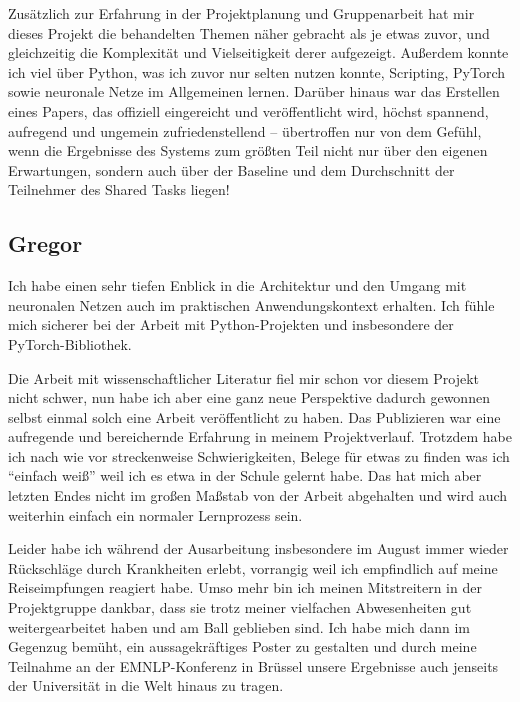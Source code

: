 \documentclass[11pt,a4paper]{article}
\begin{document}
Zusätzlich zur Erfahrung in der Projektplanung und Gruppenarbeit hat mir dieses Projekt die behandelten Themen näher gebracht als je etwas zuvor, und gleichzeitig die Komplexität und Vielseitigkeit derer aufgezeigt. Außerdem konnte ich viel über Python, was ich zuvor nur selten nutzen konnte, Scripting, PyTorch sowie neuronale Netze im Allgemeinen lernen. Darüber hinaus war das Erstellen eines Papers, das offiziell eingereicht und veröffentlicht wird, höchst spannend, aufregend und ungemein zufriedenstellend -- übertroffen nur von dem Gefühl, wenn die Ergebnisse des Systems zum größten Teil nicht nur über den eigenen Erwartungen, sondern auch über der Baseline und dem Durchschnitt der Teilnehmer des Shared Tasks liegen!

\subsection{Gregor}
Ich habe einen sehr tiefen Enblick in die Architektur und den Umgang mit neuronalen Netzen auch im praktischen Anwendungskontext erhalten. Ich fühle mich sicherer bei der Arbeit mit Python-Projekten und insbesondere der PyTorch-Bibliothek.

Die Arbeit mit wissenschaftlicher Literatur fiel mir schon vor diesem Projekt nicht schwer, nun habe ich aber eine ganz neue Perspektive dadurch gewonnen selbst einmal solch eine Arbeit veröffentlicht zu haben. Das Publizieren war eine aufregende und bereichernde Erfahrung in meinem Projektverlauf.
Trotzdem habe ich nach wie vor streckenweise Schwierigkeiten, Belege für etwas zu finden was ich \enquote{einfach weiß} weil ich es etwa in der Schule gelernt habe. Das hat mich aber letzten Endes nicht im großen Maßstab von der Arbeit abgehalten und wird auch weiterhin einfach ein normaler Lernprozess sein.

Leider habe ich während der Ausarbeitung insbesondere im August immer wieder Rückschläge durch Krankheiten erlebt, vorrangig weil ich empfindlich auf meine Reiseimpfungen reagiert habe. Umso mehr bin ich meinen Mitstreitern in der Projektgruppe dankbar, dass sie trotz meiner vielfachen Abwesenheiten gut weitergearbeitet haben und am Ball geblieben sind. Ich habe mich dann im Gegenzug bemüht, ein aussagekräftiges Poster zu gestalten und durch meine Teilnahme an der EMNLP-Konferenz in Brüssel unsere Ergebnisse auch jenseits der Universität in die Welt hinaus zu tragen.
\end{document}
